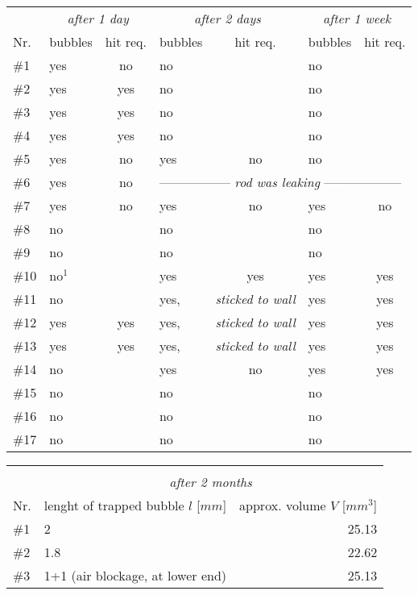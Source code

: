 \begin{table}[]
\centering
\begin{tabular}{l|lc|lc|lc}
    & \multicolumn{2}{c}{\textit{after 1 day}} 	& \multicolumn{2}{c}{\textit{after 2 days}}	& \multicolumn{2}{c}{\textit{after 1 week}}	\\ 
Nr. & bubbles	& hit req.	& bubbles 	& hit req.	& bubbles 	& hit req.	\\
\toprule
\#1   & yes	& no		& no		&		& no		&		\\
\#2   & yes	& yes		& no		&		& no		&		\\
\#3   & yes	& yes		& no		&		& no		&		\\
\#4   & yes	& yes		& no		&		& no		&		\\
\#5   & yes	& no		& yes		& no		& no		&		\\
\#6   & yes	& no		& \multicolumn{4}{l}{-----------------\textit{ rod was leaking }------------------}	\\
\#7   & yes	& no		& yes		& no		& yes		& no		\\
\#8   & no	&		& no		&		& no		&		\\
\#9   & no	&		& no		&		& no		&		\\
\#10  & no$^1$	&		& yes		& yes		& yes		& yes		\\
\#11  & no	&		& yes,		& \textit{sticked to wall} &	 yes	& yes\\
\#12  & yes	& yes		& yes,		& \textit{sticked to wall} &	 yes	& yes\\
\#13  & yes	& yes		& yes,		& \textit{sticked to wall} &	 yes	& yes\\
\#14  & no	&   		& yes		& no		& yes		& yes		\\
\#15  & no	&   		& no		&		& no		&		\\
\#16  & no	&   		& no		&		& no		&		\\
\#17  & no	&   		& no		&		& no		&		\\
\bottomrule
\end{tabular}
\begin{tabular}{l|lr}
\multicolumn{3}{c}{}								\\
& \multicolumn{2}{c}{\textit{after 2 months}}					\\ 
Nr. & lenght of trapped bubble $l$ [$mm$] 	& approx. volume $V$ [$mm^3$]	\\
\toprule
\#1   & 2					& 25.13				\\
\#2   & 1.8					& 22.62				\\
\#3   & 1+1 (air blockage, at lower end)	& 25.13				\\

\end{tabular}
\end{table}
